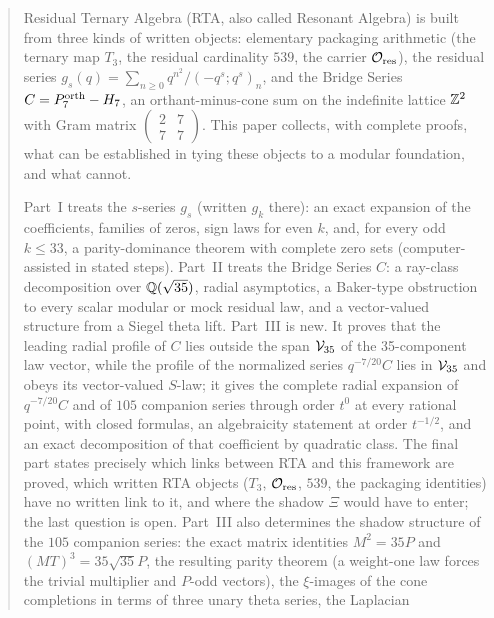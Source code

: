 \begin{abstract}
Residual Ternary Algebra (RTA, also called Resonant Algebra) is built from three kinds of written objects: elementary packaging arithmetic
(the ternary map $T_3$, the residual cardinality $539$, the carrier $\mathcal O_{\rm res}$), the residual series
$g_s(q)=\sum_{n\ge0}q^{n^2}/(-q^s;q^s)_n$, and the Bridge Series $C=\Porth_7-H_7$, an orthant-minus-cone sum on the indefinite lattice
$\Z^2$ with Gram matrix $\left(\begin{smallmatrix}2&7\\7&7\end{smallmatrix}\right)$. This paper collects, with complete proofs, what can be
established in tying these objects to a modular foundation, and what cannot.

Part~I treats the $s$-series $g_s$ (written $g_k$ there): an exact expansion of the coefficients, families of zeros, sign laws for even $k$,
and, for every odd $k\le33$, a parity-dominance theorem with complete zero sets (computer-assisted in stated steps). Part~II treats the Bridge
Series $C$: a ray-class decomposition over $\Q(\sqrt{35})$, radial asymptotics, a Baker-type obstruction to every scalar modular or mock residual law,
and a vector-valued structure from a Siegel theta lift. Part~III is new. It proves that the leading radial profile of $C$ lies outside the span
$\VV$ of the 35-component law vector, while the profile of the normalized series $q^{-7/20}C$ lies in $\VV$ and obeys its vector-valued
$S$-law; it gives the complete radial expansion of $q^{-7/20}C$ and of $105$ companion series through order $t^0$ at every rational point,
with closed formulas, an algebraicity statement at order $t^{-1/2}$, and an exact decomposition of that coefficient by quadratic class.
The final part states precisely which links between RTA and this framework are proved, which written RTA objects ($T_3$, $\mathcal O_{\rm res}$,
$539$, the packaging identities) have no written link to it, and where the shadow $\Xi$ would have to enter; the last question is open.
Part~III also determines the shadow structure of the $105$ companion series: the exact matrix identities $M^2=35P$ and $(MT)^3=35\sqrt{35}P$, the resulting parity
theorem (a weight-one law forces the trivial multiplier and $P$-odd vectors), the $\xi$-images of the cone completions in terms of three unary theta series, the Laplacian

\end{abstract}
